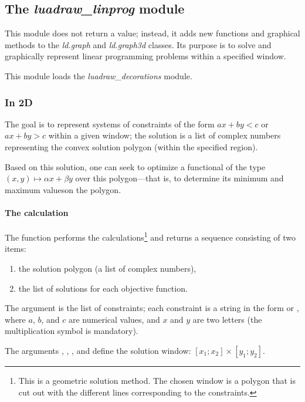 \subsection{The \emph{luadraw\_linprog} module}

This module does not return a value; instead, it adds new functions and graphical methods to the \emph{ld.graph} and \emph{ld.graph3d} classes. Its purpose is to solve and graphically represent linear programming problems within a specified window.

This module loads the \emph{luadraw\_decorations} module.

\subsubsection{In 2D}

The goal is to represent systems of constraints of the form $ax+by<c$ or $ax+by>c$ within a given window; the solution is a list of complex numbers representing the convex solution polygon (within the specified region).

Based on this solution, one can seek to optimize a functional of the type $(x,y)\mapsto \alpha x+\beta y$ over this polygon—that is, to determine its minimum and maximum values ​​on the polygon.

\paragraph{The calculation}

The function  performs the calculations\footnote{This is a geometric solution method. The chosen window is a polygon that is cut out with the different lines corresponding to the constraints.} and returns a sequence consisting of two items:
\begin{enumerate}
    \item the solution polygon (a list of complex numbers),
    \item the list of solutions for each objective function. 
\end{enumerate}

The  argument is the list of constraints; each constraint is a string in the form  or , where $a$, $b$, and $c$ are numerical values, and $x$ and $y$ are two letters (the multiplication symbol is mandatory).

The arguments , , , and  define the solution window: $[x_1;x_2]\times [y_1;y_2]$.

